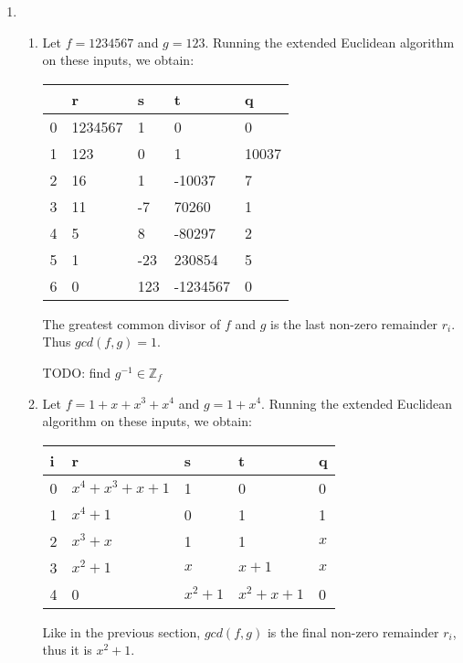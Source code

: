 \documentclass[11pt,a4paper]{article}
\begin{document}
\begin{enumerate}
	\item
	      \begin{enumerate}
		      \item Let  $f = 1234567$ and $g = 123$. Running the extended Euclidean algorithm on these inputs, we obtain:
		            \begin{center}
			            \begin{tabular}{l|l|l|l|l}
				              & r       & s   & t        & q     \\
				            \hline
				            0 & 1234567 & 1   & 0        & 0     \\
				            1 & 123     & 0   & 1        & 10037 \\
				            2 & 16      & 1   & -10037   & 7     \\
				            3 & 11      & -7  & 70260    & 1     \\
				            4 & 5       & 8   & -80297   & 2     \\
				            5 & 1       & -23 & 230854   & 5     \\
				            6 & 0       & 123 & -1234567 & 0     \\
			            \end{tabular}
		            \end{center}

		            The greatest common divisor of $f$ and $g$ is the last non-zero remainder $r_i$. Thus $gcd(f, g) = 1$.

		            TODO: find $g^{-1} \in \mathbb{Z}_f$

		      \item Let  $f = 1 + x + x^3 + x^4$ and $g = 1 + x^4$. Running the extended Euclidean algorithm on these inputs, we obtain:
		            \begin{center}
			            \begin{tabular}{l|l|l|l|l}
				            i & r                   & s         & t             & q   \\
				            \hline
				            0 & $x^4 + x^3 + x + 1$ & 1         & 0             & 0   \\
				            1 & $x^4 + 1$           & 0         & 1             & 1   \\
				            2 & $x^3 + x$           & 1         & 1             & $x$ \\
				            3 & $x^2 + 1$           & $x$       & $x + 1$       & $x$ \\
				            4 & 0                   & $x^2 + 1$ & $x^2 + x + 1$ & 0   \\
			            \end{tabular}
		            \end{center}
		            Like in the previous section, $gcd(f, g)$ is the final non-zero remainder $r_i$, thus it is $x^2 + 1$.
	      \end{enumerate}


\end{enumerate}
\end{document}
